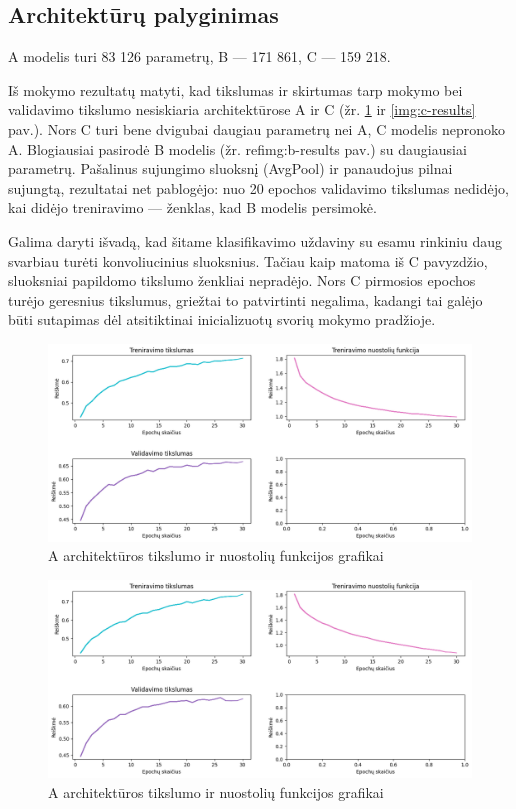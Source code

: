 \documentclass{VUMIFPSbakalaurinis}
\begin{document}
\subsection{Architektūrų palyginimas}

A modelis turi 83 126 parametrų, B — 171 861, C — 159 218.

Iš mokymo rezultatų matyti, kad tikslumas ir skirtumas tarp
mokymo bei validavimo tikslumo nesiskiaria architektūrose
A ir C (žr. \ref{img:a-results} ir \ref{img:c-results} pav.).
Nors C turi bene dvigubai daugiau parametrų nei A, C modelis
nepronoko A. Blogiausiai pasirodė B modelis (žr. ref{img:b-results} pav.) 
su daugiausiai parametrų. Pašalinus sujungimo sluoksnį (AvgPool) ir
panaudojus pilnai sujungtą, rezultatai net pablogėjo: nuo 20 epochos
validavimo tikslumas nedidėjo, kai didėjo treniravimo — ženklas,
kad B modelis persimokė.

Galima daryti išvadą, kad šitame klasifikavimo uždaviny su
esamu rinkiniu daug svarbiau turėti konvoliucinius sluoksnius. 
Tačiau kaip matoma iš C pavyzdžio, sluoksniai papildomo  tikslumo
ženkliai nepradėjo. Nors C pirmosios epochos turėjo
geresnius tikslumus, griežtai to patvirtinti negalima, kadangi
tai galėjo būti sutapimas dėl atsitiktinai inicializuotų
svorių mokymo pradžioje.


\begin{figure}[H]
  \centering
  \includegraphics[scale=0.5]{img/A.png}
  \caption{A architektūros tikslumo ir nuostolių funkcijos grafikai}
  \label{img:a-results}
\end{figure}

\begin{figure}[H]
  \centering
  \includegraphics[scale=0.5]{img/B.png}
  \caption{A architektūros tikslumo ir nuostolių funkcijos grafikai}
  \label{img:b-results}
\end{figure}
\end{document}
